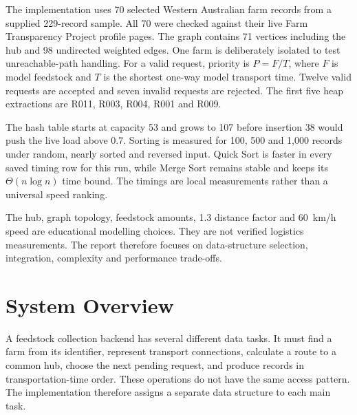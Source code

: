\documentclass[10pt,a4paper]{article}
\begin{document}
The implementation uses 70 selected Western Australian farm records from a supplied 229-record sample. All 70 were checked against their live Farm Transparency Project profile pages. The graph contains 71 vertices including the hub and 98 undirected weighted edges. One farm is deliberately isolated to test unreachable-path handling. For a valid request, priority is $P=F/T$, where $F$ is model feedstock and $T$ is the shortest one-way model transport time. Twelve valid requests are accepted and seven invalid requests are rejected. The first five heap extractions are R011, R003, R004, R001 and R009.

The hash table starts at capacity 53 and grows to 107 before insertion 38 would push the live load above 0.7. Sorting is measured for 100, 500 and 1,000 records under random, nearly sorted and reversed input. Quick Sort is faster in every saved timing row for this run, while Merge Sort remains stable and keeps its $\Theta(n\log n)$ time bound. The timings are local measurements rather than a universal speed ranking.

The hub, graph topology, feedstock amounts, 1.3 distance factor and 60~km/h speed are educational modelling choices. They are not verified logistics measurements. The report therefore focuses on data-structure selection, integration, complexity and performance trade-offs.

\clearpage
{}
\tableofcontents

\clearpage
{}
{}
\listoffigures

\vspace{0.35em}
{}
\listoftables

\clearpage
{}
\setcounter{page}{1}



\section{System Overview}
\label{sec:overview}

A feedstock collection backend has several different data tasks. It must find a farm from its identifier, represent transport connections, calculate a route to a common hub, choose the next pending request, and produce records in transportation-time order. These operations do not have the same access pattern. The implementation therefore assigns a separate data structure to each main task.
\end{document}
